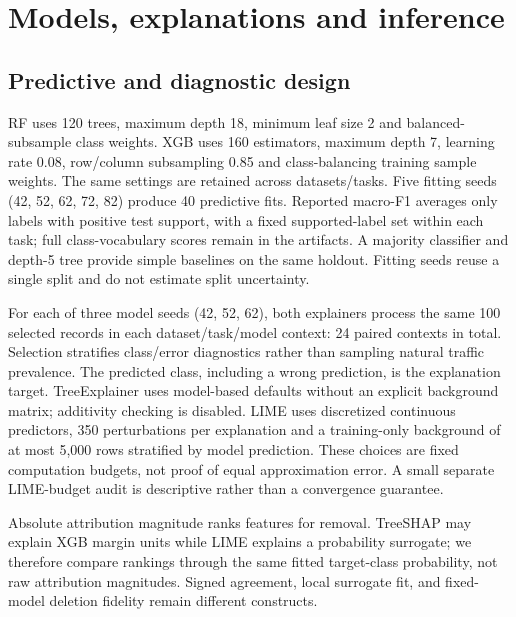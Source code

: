 \documentclass[conference,letterpaper]{IEEEtran}
\begin{document}
\section{Models, explanations and inference}
\subsection{Predictive and diagnostic design}
RF uses 120 trees, maximum depth 18, minimum leaf size 2 and balanced-subsample class weights. XGB uses 160 estimators, maximum depth 7, learning rate 0.08, row/column subsampling 0.85 and class-balancing training sample weights. The same settings are retained across datasets/tasks. Five fitting seeds (42, 52, 62, 72, 82) produce 40 predictive fits. Reported macro-F1 averages only labels with positive test support, with a fixed supported-label set within each task; full class-vocabulary scores remain in the artifacts. A majority classifier and depth-5 tree provide simple baselines on the same holdout. Fitting seeds reuse a single split and do not estimate split uncertainty.

For each of three model seeds (42, 52, 62), both explainers process the same 100 selected records in each dataset/task/model context: 24 paired contexts in total. Selection stratifies class/error diagnostics rather than sampling natural traffic prevalence. The predicted class, including a wrong prediction, is the explanation target. TreeExplainer uses model-based defaults without an explicit background matrix; additivity checking is disabled. LIME uses discretized continuous predictors, 350 perturbations per explanation and a training-only background of at most 5,000 rows stratified by model prediction. These choices are fixed computation budgets, not proof of equal approximation error. A small separate LIME-budget audit is descriptive rather than a convergence guarantee.

Absolute attribution magnitude ranks features for removal. TreeSHAP may explain XGB margin units while LIME explains a probability surrogate; we therefore compare rankings through the same fitted target-class probability, not raw attribution magnitudes. Signed agreement, local surrogate fit, and fixed-model deletion fidelity remain different constructs.
\end{document}
